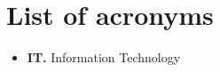 \chapter*{List of acronyms}

\begin{itemize}
\item \textbf{IT.} Information Technology

\end{itemize}